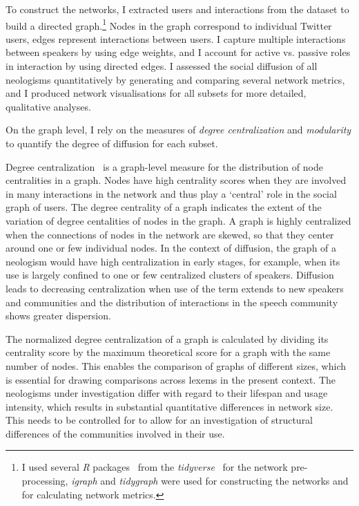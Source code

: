 \documentclass[
  a4paper,
  abstract=on,
  captions=tableabove
  ]{scrartcl}
\begin{document}
  To construct the networks, I extracted users and interactions from the dataset to build a directed graph.\footnote{I used several \emph{R} packages~\parencite{RCoreTeam2018LanguageEnvironment} from the \emph{tidyverse}~\parencite{Wickham2019WelcomeTidyverse} for the network pre-processing, \emph{igraph} and \emph{tidygraph} were used for constructing the networks and for calculating network metrics.} Nodes in the graph correspond to individual Twitter users, edges represent interactions between users. I capture multiple interactions between speakers by using edge weights, and I account for active vs. passive roles in interaction by using directed edges. I assessed the social diffusion of all neologisms quantitatively by generating and comparing several network metrics, and I produced network visualisations for all subsets for more detailed, qualitative analyses.

  On the graph level, I rely on the measures of \emph{degree centralization} and \emph{modularity} to quantify the degree of diffusion for each subset.

  Degree centralization~\parencite{Freeman1978CentralitySocial} is a graph-level measure for the distribution of node centralities in a graph. Nodes have high centrality scores when they are involved in many interactions in the network and thus play a `central' role in the social graph of users. The degree centrality of a graph indicates the extent of the variation of degree centalities of nodes in the graph. A graph is highly centralized when the connections of nodes in the network are skewed, so that they center around one or few individual nodes. In the context of diffusion, the graph of a neologism would have high centralization in early stages, for example, when its use is largely confined to one or few centralized clusters of speakers. Diffusion leads to decreasing centralization when use of the term extends to new speakers and communities and the distribution of interactions in the speech community shows greater dispersion.

  The normalized degree centralization of a graph is calculated by dividing its centrality score by the maximum theoretical score for a graph with the same number of nodes. This enables the comparison of graphs of different sizes, which is essential for drawing comparisons across lexems in the present context. The neologisms under investigation differ with regard to their lifespan and usage intensity, which results in substantial quantitative differences in network size. This needs to be controlled for to allow for an investigation of structural differences of the communities involved in their use.
\end{document}
